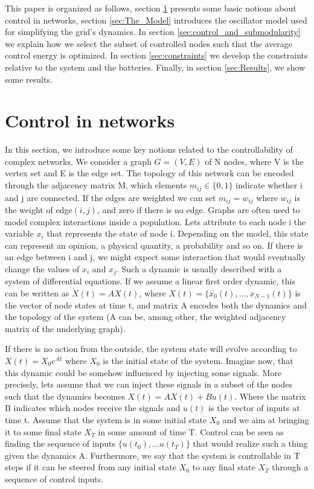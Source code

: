 \documentclass[conference]{IEEEtran}
\begin{document}
This paper is organized as follows, section \ref{sec:control} presents some basic notions about control in networks, section \ref{sec:The_Model} introduces the oscillator model used for simplifying the grid's dynamics. In section \ref{sec:control_and_submodularity} we explain how we select the subset of controlled nodes such that the average control energy is optimized. In section \ref{sec:constraints} we develop the constraints relative to the system and the batteries. Finally, in section \ref{sec:Results}, we show some results.



\section{Control in networks}
\label{sec:control}

In this section, we introduce some key notions related to the controllability of complex networks. We consider a graph $G=(V,E)$ of N nodes, where V is the vertex set and E is the edge set. The topology of this network can be encoded through the adjacency matrix M, which elements $m_{ij} \in \{0,1\}$ indicate whether i and j are connected. If the edges are weighted we can set $m_{ij} = w_{ij}$ where $w_{ij}$ is the weight of edge$(i,j)$, and zero if there is no edge. Graphs are often used to model complex interactions inside a population. Lets attribute to each node i the variable $ x_i $ that represents the state of node i. Depending on the model, this state can represent an opinion, a physical quantity, a probability and so on. If there is an edge between i and j, we might expect some interaction that would eventually change the values of $x_i$ and $x_j$. Such a dynamic is usually described with a system of differential equations. If we assume a linear first order dynamic, this can be written as $ \dot{X}(t) = A X(t) $, where $X(t)=\{x_0(t),...,x_{N-1}(t)\}$ is the vector of node states at time t, and matrix A encodes both the dynamics and the topology of the system (A can be, among other, the weighted adjacency matrix of the underlying graph).

If there is no action from the outside, the system state will evolve according to $ X(t) = X_0 e^{At} $ where $X_0$ is the initial state of the system. Imagine now, that this dynamic could be somehow influenced by injecting some signals. More precisely, lets assume that we can inject these signals in a subset of the nodes such that the dynamics becomes $ \dot{ X }(t) = A X(t) + B u(t) $. Where the matrix B indicates which nodes receive the signals and $ u(t) $ is the vector of inputs at time t. Assume that the system is in some initial state $X_0$ and we aim at bringing it to some final state $X_T$ in some amount of time T. Control can be seen as finding the sequence of inputs $\{u(t_0),...u(t_T)\} $ that would realize such a thing given the dynamics A. Furthermore, we say that the system is controllable in T steps if it can be steered from any initial state $ X_0 $ to any final state $ X_T $ through a sequence of control inputs. 
\end{document}
